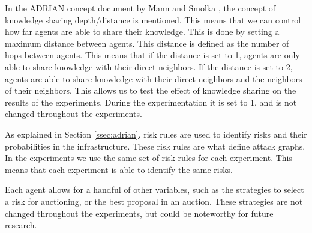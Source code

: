 \label{sssec:knowledge-depth}
In the ADRIAN concept document by Mann and Smolka \cite{mann2023ADRIAN}, the concept of knowledge sharing depth/distance is mentioned.  This means that we can control how far agents are able to share their knowledge. This is done by setting a maximum distance between agents. This distance is defined as the number of hops between agents. This means that if the distance is set to 1, agents are only able to share knowledge with their direct neighbors. If the distance is set to 2, agents are able to share knowledge with their direct neighbors and the neighbors of their neighbors. This allows us to test the effect of knowledge sharing on the results of the experiments. During the experimentation it is set to 1, and is not changed throughout the experiments.

\label{sssec:risk-rules}
As explained in Section \ref{ssec:adrian}, risk rules are used to identify risks and their probabilities in the infrastructure. These risk rules are what define attack graphs. In the experiments we use the same set of risk rules for each experiment. This means that each experiment is able to identify the same risks.

Each agent allows for a handful of other variables, such as the strategies to select a risk for auctioning, or the best proposal in an auction. These strategies are not changed throughout the experiments, but could be noteworthy for future research.





